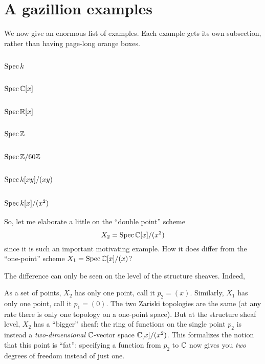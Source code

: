 \section{A gazillion examples}
We now give an enormous list of examples.
Each example gets its own subsection,
rather than having page-long orange boxes.

\subsection{$\operatorname{Spec} k$}
\subsection{$\operatorname{Spec} \mathbb C[x]$}
\subsection{$\operatorname{Spec} \mathbb R[x]$}
\subsection{$\operatorname{Spec} \mathbb Z$}
\subsection{$\operatorname{Spec} \mathbb Z/60\mathbb Z$}
\subsection{$\operatorname{Spec} k[xy]/(xy)$}
\subsection{$\operatorname{Spec} k[x]/(x^2)$}
So, let me elaborate a little on the ``double point'' scheme
\[ X_2 = \operatorname{Spec} \mathbb C[x] / (x^2) \]
since it is such an important motivating example.
How it does differ from the ``one-point'' scheme $X_1 = \operatorname{Spec} \mathbb C[x] / (x)$?

The difference can only be seen on the level of the structure sheaves.
Indeed,
\begin{itemize}
	\ii As a set of points, $X_2$ has only one point, call it $p_2 = (x)$.
	Similarly, $X_1$ has only one point, call it $p_1 = (0)$.
	\ii The two Zariski topologies are the same
	(at any rate there is only one topology on a one-point space).
	\ii But at the structure sheaf level, $X_2$ has a ``bigger'' sheaf:
	the ring of functions on the single point $p_2$ is instead
	a \emph{two-dimensional} $\mathbb C$-vector space $\mathbb C[x]/(x^2)$.
	This formalizes the notion that this point is ``fat'':
	specifying a function from $p_2$ to $\mathbb C$ now gives you
	\emph{two} degrees of freedom instead of just one.
\end{itemize}

